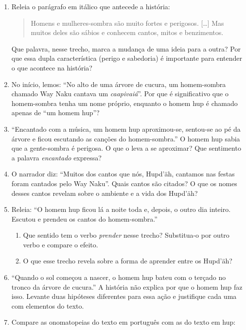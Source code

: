 \begin{enumerate}[label=\arabic*.]
\item Releia o parágrafo em itálico que antecede a história:
\begin{quote}
Homens e mulheres-sombra são muito fortes e perigosos. [\ldots] Mas
muitos deles são sábios e conhecem cantos, mitos e benzimentos.
\end{quote}
Que palavra, nesse trecho, marca a mudança de uma ideia para a outra?
Por que essa dupla característica (perigo e sabedoria) é importante para
entender o que acontece na história?

\item No início, lemos: ``No alto de uma árvore de cucura, um
homem-sombra chamado Way Naku cantava um \textit{caapivaiá}''. Por que é
significativo que o homem-sombra tenha um nome próprio, enquanto o
homem hup é chamado apenas de ``um homem hup''?

\item ``Encantado com a música, um homem hup aproximou-se, sentou-se ao
pé da árvore e ficou escutando as canções do homem-sombra.'' O homem hup
sabia que a gente-sombra é perigosa. O que o leva a se aproximar? Que
sentimento a palavra \textit{encantado} expressa?

\item O narrador diz: ``Muitos dos cantos que nós, Hupd'äh, cantamos nas
festas foram cantados pelo Way Naku''. Quais cantos são citados? O que
os nomes desses cantos revelam sobre o ambiente e a vida dos Hupd'äh?

\item Releia: ``O homem hup ficou lá a noite toda e, depois, o outro dia
inteiro. Escutou e prendeu os cantos do homem-sombra.''
\begin{enumerate}[label=\alph*)]
\item Que sentido tem o verbo \textit{prender} nesse trecho? Substitua-o
por outro verbo e compare o efeito.
\item O que esse trecho revela sobre a forma de aprender entre os
Hupd'äh?
\end{enumerate}

\item ``Quando o sol começou a nascer, o homem hup bateu com o terçado
no tronco da árvore de cucura.'' A história não explica por que o homem
hup faz isso. Levante duas hipóteses diferentes para essa ação e
justifique cada uma com elementos do texto.

\item Compare as onomatopeias do texto em português com as do texto em
hup:


\end{enumerate}
